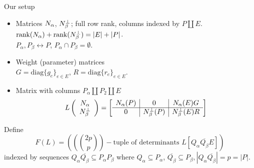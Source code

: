 \documentclass{beamer}
\newcommand{\dunion}{\coprod}
\begin{document}
\begin{frame}{Our setup}
  \begin{itemize}
  \item
    Matrices $N_{\alpha}$, $N_{\beta}^{\perp}$; full row rank, columns indexed by
    $P\dunion E$. $\text{rank}(N_{\alpha})+\text{rank}(N_{\beta}^{\perp})=|E|+|P|$.\\
    $P_{\alpha},P_{\beta}\leftrightarrow P$, $P_{\alpha}\cap P_{\beta}=\emptyset$.
  \item
    Weight (parameter) matrices\\
    $G=\text{diag}\{g_e\}_{e\in E} $,
    $R=\text{diag}\{r_e\}_{e\in E} $.
  \item
    Matrix with columns $P_\alpha \dunion P_2 \dunion E$
    \[
    L\left( \begin{array}{c} N_{\alpha}\\ N_{\beta}^{\perp} \end{array} \right)
    = \left[\begin{array}{c|c|c} N_{\alpha}(P)  &  0  &  N_{\alpha}(E)G \\  \hline
0  & N_{\beta}^{\perp}(P)  &  N_{\beta}^{\perp}(E)R \end{array}\right]
    \]
  \end{itemize}

  Define
  \[
  F(L)=((\binom{2p}{p})-\text{tuple of determinants\ } L[Q_\alpha\overline{Q_\beta}E])
  \]
  indexed by sequences $Q_\alpha \overline{Q_\beta} \subseteq P_\alpha P_\beta$ where
  $Q_\alpha\subseteq P_\alpha$, $\overline{Q_\beta}\subseteq P_\beta, |Q_\alpha \overline{Q_\beta}|=p=|P|$.
    
\end{frame}
\end{document}
